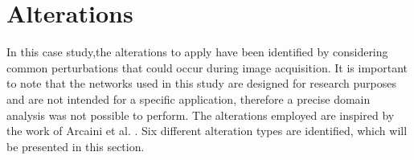 \section{Alterations}

In this case study,the alterations to apply have been identified by considering common perturbations that could occur during image acquisition. It is important to note that the networks used in this study are designed for research purposes and are not intended for a specific application, therefore a precise domain analysis was not possible to perform. The alterations employed are inspired by the work of Arcaini et al. \cite{9176802}. Six different alteration types are identified, which will be presented in this section.